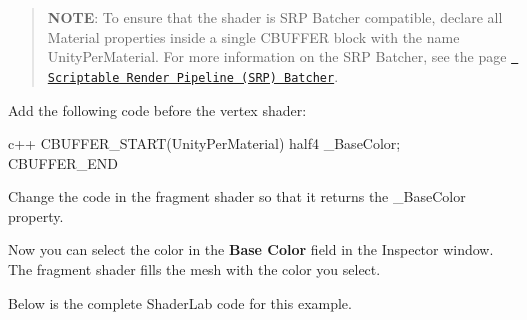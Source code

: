 \begin{quote}
{\bfseries{NOTE}}\+: To ensure that the  shader is SRP Batcher compatible, declare all Material properties inside a single {\ttfamily CBUFFER} block with the name {\ttfamily Unity\+Per\+Material}. For more information on the SRP Batcher, see the page \href{https://docs.unity3d.com/Manual/SRPBatcher.html}{\texttt{ Scriptable Render Pipeline (SRP) Batcher}}. \end{quote}


Add the following code before the vertex shader\+:

{\ttfamily c++ CBUFFER\+\_\+\+START(\+Unity\+Per\+Material) half4 \+\_\+\+Base\+Color; CBUFFER\+\_\+\+END }


\begin{DoxyEnumerate}
\item Change the code in the fragment shader so that it returns the {\ttfamily \+\_\+\+Base\+Color} property.


\begin{DoxyCode}{0}
\DoxyCodeLine{++}
\DoxyCodeLine{\ \ \ \{}
\DoxyCodeLine{\ \ \ \}}

\end{DoxyCode}

\end{DoxyEnumerate}

Now you can select the color in the {\bfseries{Base Color}} field in the Inspector window. The fragment shader fills the mesh with the color you select.



Below is the complete Shader\+Lab code for this example.


